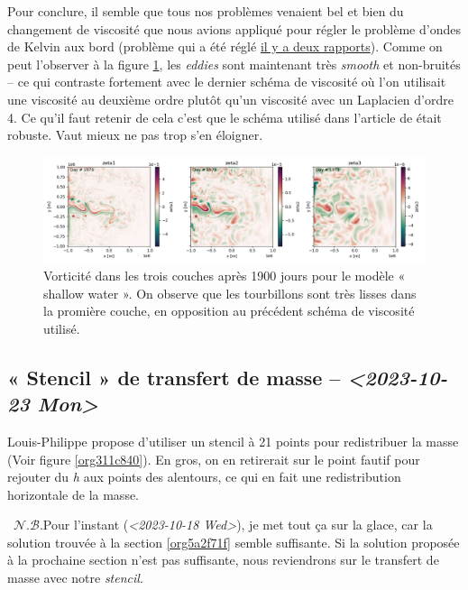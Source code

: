 \documentclass[10pt]{article}
\numberwithin{equation}{section}
\newcommand{\nb}{\raisebox{0.8pt}{\scriptsize\textleaf}\ $\mathscr{N. B.}$\hspace{4pt}}
\begin{document}
Pour conclure, il semble que tous nos problèmes venaient bel et bien du changement de viscosité que nous avions appliqué pour régler le problème d'ondes de Kelvin aux bord (problème qui a été réglé \href{rapport-2023-10-06.pdf}{il y a deux rapports}).
Comme on peut l'observer à la figure \ref{fig:orgaadbea3}, les \emph{eddies} sont maintenant très \emph{smooth} et non-bruités -- ce qui contraste fortement avec le dernier schéma de viscosité où l'on utilisait une viscosité au deuxième ordre plutôt qu'un viscosité avec un Laplacien d'ordre 4.
Ce qu'il faut retenir de cela c'est que le schéma utilisé dans l'article de  était robuste.
Vaut mieux ne pas trop s'en éloigner. 

\begin{figure}[htbp]
\centering
\includegraphics[width=.9\linewidth]{figures/debuggage/2023_10_17_smooth_zeta.png}
\caption{\label{fig:orgaadbea3}Vorticité dans les trois couches après 1900 jours pour le modèle « shallow water ». On observe que les tourbillons sont très lisses dans la promière couche, en opposition au précédent schéma de viscosité utilisé.}
\end{figure}


\subsection{« Stencil » de transfert de masse -- \textit{<2023-10-23 Mon>}}
\label{sec:org49f3db7}
\label{orgaefbc54}

Louis-Philippe propose d'utiliser un stencil à 21 points pour redistribuer la masse (Voir figure \ref{org311c840}).
En gros, on en retirerait sur le point fautif pour rejouter du \emph{h} aux points des alentours, ce qui en fait une redistribution horizontale de la masse.\bigskip

\nb Pour l'instant (\textit{<2023-10-18 Wed>}), je met tout ça sur la glace, car la solution trouvée à la section \ref{org5a2f71f} semble suffisante.
Si la solution proposée à la prochaine section n'est pas suffisante, nous reviendrons sur le transfert de masse avec notre \emph{stencil}. 
\end{document}
